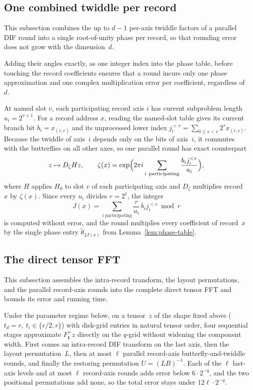 \subsection{One combined twiddle per record}\label{sec:direct-fft-twiddle}

This subsection combines the up to $d-1$ per-axis twiddle factors of a parallel DIF round into a single root-of-unity
phase per record, so that rounding error does not grow with the dimension~$d$.

Adding their angles exactly, as one integer index into the phase table, before touching the record coefficients ensures
that a round incurs only one phase approximation and one complex multiplication error per coefficient, regardless
of~$d$.

At named slot $v$, each participating record axis $i$ has current subproblem length $u_i=2^{v+1}$. For a record address
$x$, reading the named-slot table gives its current branch bit $b_i=x_{(i,v)}$ and its unprocessed lower index
$j_i^{<v}=\sum_{0\le s<v}2^sx_{(i,s)}$. Because the twiddle of axis~$i$ depends only on the bits of axis~$i$, it
commutes with the butterflies on all other axes, so one parallel round has exact counterpart
\begin{equation}\label{eq:combined-round}
  z\mapsto D_\zeta Hz,\qquad
  \zeta(x)=\exp\Bigl(2\pi i\sum_{i\ \mathrm{participating}}\frac{b_ij_i^{<v}}{u_i}\Bigr),
\end{equation}
where $H$ applies $H_0$ to slot $v$ of each participating axis and $D_\zeta$ multiplies record~$x$ by $\zeta(x)$. Since
every $u_i$ divides $r=2^\ell$, the integer
\[
  J(x)=\sum_{i\ \mathrm{participating}}\frac{r}{u_i}\,b_ij_i^{<v}\bmod r
\]
is computed without error, and the round multiplies every coefficient of record~$x$ by the single phase entry
$\tilde\theta_{2J(x)}$ from Lemma~\ref{lem:phase-table}.

\subsection{The direct tensor FFT}\label{sec:direct-fft-thm}

This subsection assembles the intra-record transform, the layout permutations, and the parallel record-axis rounds into
the complete direct tensor FFT and bounds its error and running time.

Under the parameter regime below, on a tensor~$z$ of the shape fixed above ($t_d=r,\ t_i\in\{r/2,r\}$) with disk-grid
entries in natural tensor order, four sequential stages approximate $F^+_{\mathbf t}z$ directly on the $q$-grid without
widening the component width. First comes an intra-record DIF transform on the last axis, then the layout
permutation~$L$, then at most $\ell$ parallel record-axis butterfly-and-twiddle rounds, and finally the restoring
permutation $U=(LB)^{-1}$. Each of the $\ell$ last-axis levels and at most $\ell$ record-axis rounds adds error below
$6\cdot 2^{-q}$, and the two positional permutations add none, so the total error stays under $12\ell\cdot 2^{-q}$.

